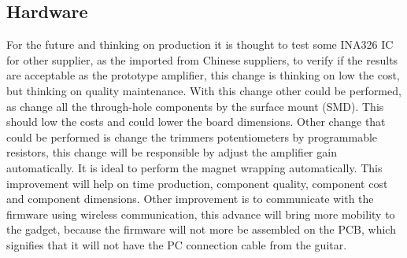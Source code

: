 \subsection{Hardware}
For the future and thinking on production it is thought to test some INA326 IC
for other supplier, as the imported from Chinese suppliers, to verify if the results
are acceptable as the prototype amplifier, this change is thinking on low the cost,
but thinking on quality maintenance.
With this change other could be performed, as change all the through-hole components
by the surface mount (SMD). This should low the costs and could lower the board dimensions.
Other change that could be performed is change the trimmers potentiometers by programmable
resistors, this change will be responsible by adjust the amplifier gain automatically.
It is ideal to perform the magnet wrapping automatically. This improvement will help on time
production, component quality, component cost and component dimensions.
Other improvement is to communicate with the firmware using wireless communication,
this advance will bring more mobility to the gadget, because the firmware will not more be
assembled on the PCB, which signifies that it will not have the PC connection cable from the guitar.

